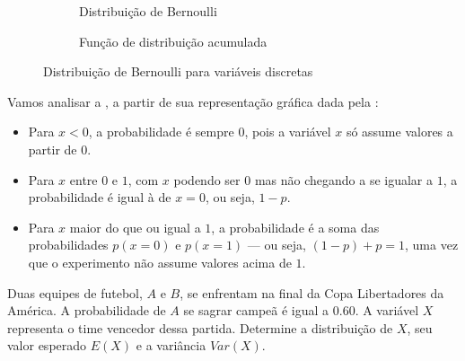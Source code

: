 \begin{figure}[ht!]
    \centering
    \begin{subfigure}{0.48\textwidth}
        \centering
        
        \caption{Distribuição de Bernoulli}
        \label{fig:dist-bernoulli}
    \end{subfigure}
    \hfill
    \begin{subfigure}{0.48\textwidth}
        \centering
        
        \caption{Função de distribuição acumulada}
        \label{fig:dist-bernoulli-acumulada}
    \end{subfigure}
    \caption{Distribuição de Bernoulli para variáveis discretas}
    \label{fig:dist-bernoulli-grupo}
\end{figure}

Vamos analisar a , a partir de sua
representação gráfica dada pela :
\begin{itemize}
    \item Para $x<0$, a probabilidade é sempre $0$, pois a variável $x$ só
    assume valores a partir de $0$.
    \item Para $x$ entre $0$ e $1$, com $x$ podendo ser $0$ mas não chegando a
    se igualar a $1$, a probabilidade é igual à de $x=0$, ou seja, $1-p$.
    \item Para $x$ maior do que ou igual a $1$, a probabilidade é a soma das
    probabilidades $p(x=0)$ e $p(x=1)$ --- ou seja, $(1-p)+p=1$, uma vez que o
    experimento não assume valores acima de $1$.
\end{itemize}

\begin{eg}
Duas equipes de futebol, $A$ e $B$, se enfrentam na final da Copa
Libertadores da América. A probabilidade de $A$ se sagrar campeã é igual a
$0.60$. A variável $X$ representa o time vencedor dessa partida. Determine
a distribuição de $X$, seu valor esperado $E(X)$ e a variância $Var(X)$.
\end{eg}

